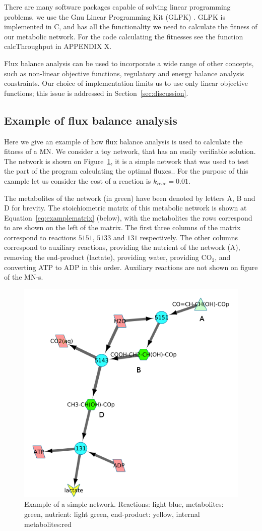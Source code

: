 \documentclass[a4paper,12pt]{article}
\begin{document}
	
	There are many software packages capable of solving linear programming problems, we use the Gnu Linear Programming Kit (GLPK) \cite{glpk}. GLPK is implemented in C, and has all the functionality we need to calculate the fitness of our metabolic network. For the code calculating the fitnesses see the function calcThroughput in APPENDIX X.

	Flux balance analysis can be used to incorporate a wide range of other concepts, such as non-linear objective functions, regulatory and energy balance analysis constraints\cite{fbaconstraints}. Our choice of implementation limits us to use only linear objective functions; this issue is addressed in Section~\ref{sec:discussion}.

\subsection*{Example of flux balance analysis}
\label{sub:example_of_flux_balance_analysis}

Here we give an example of how flux balance analysis is used to calculate the fitness of a MN. We consider a toy network, that has an easily verifiable solution. The network is shown on Figure~\ref{fig:examplenetwork}, it is a simple network that was used to test the part of the program calculating the optimal fluxes.. For the purpose of this example let us consider the cost of a reaction is $k_{reac}=0.01$.


	The metabolites of the network (in green) have been denoted by letters A, B and D for brevity. The stoichiometric matrix of this metabolic network is shown at Equation~\ref{eq:examplematrix} (below), with the metabolites the rows correspond to are shown on the left of the matrix. The first three columns of the matrix correspond to reactions $5151$, $5133$ and $131$ respectively. The other columns correspond to auxiliary reactions, providing the nutrient of the network (A), removing the end-product (lactate), providing water, providing CO$_2$, and converting ATP to ADP in this order. Auxiliary reactions are not shown on figure of the MN-s. 

\begin{figure}[htbp]
	\centering
	\includegraphics[width=0.5\linewidth]{initial_network_ABC.png}
	\caption{Example of a simple network. Reactions: light blue, metabolites: green, nutrient: light green, end-product: yellow, internal metabolites:red}
	\label{fig:examplenetwork}
\end{figure}
\end{document}
